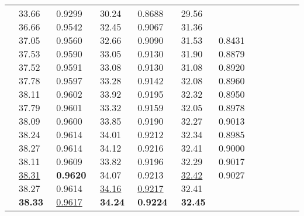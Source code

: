 \documentclass[runningheads]{llncs}
\begin{document}
\begin{table}[!ht]
\begin{tabular}{|p{7em}|p{2.5em}|p{2.5em}|p{3em}|p{2.5em}|p{3em}|p{2.5em}|p{3em}|p{2.5em}|p{3em}|p{2.5em}|p{3em}|}
		 \newline{} \newline{} \newline{} \newline{} \newline{} \newline{} \newline{} \newline{} \newline{} \newline{}  \newline{}  \newline{}  \newline{}  & 33.66 \newline{}36.66 \newline{}37.05 \newline{}37.53 \newline{}37.52 \newline{}37.78 \newline{}38.11 \newline{}37.79 \newline{}38.09 \newline{}38.24 \newline{}38.27 \newline{}38.11 \newline{}\underline{38.31} \newline{}38.27 \newline{}\bfseries{38.33} & 0.9299 \newline{}0.9542 \newline{}0.9560 \newline{}0.9590 \newline{}0.9591 \newline{}0.9597 \newline{}0.9602 \newline{}0.9601 \newline{}0.9600 \newline{}0.9614 \newline{}0.9614 \newline{}0.9609 \newline{}\textbf{0.9620} \newline{}0.9614 \newline{}\underline{0.9617}  & 30.24 \newline{}32.45 \newline{}32.66 \newline{}33.05 \newline{}33.08 \newline{}33.28 \newline{}33.92 \newline{}33.32 \newline{}33.85 \newline{}34.01 \newline{}34.12 \newline{}33.82 \newline{}34.07 \newline{}\underline{34.16} \newline{}\bfseries{34.24}  & 0.8688 \newline{}0.9067 \newline{}0.9090 \newline{}0.9130 \newline{}0.9130 \newline{}0.9142 \newline{}0.9195 \newline{}0.9159 \newline{}0.9190 \newline{}0.9212 \newline{}0.9216 \newline{}0.9196 \newline{}0.9213 \newline{}\underline{0.9217} \newline{}\bfseries{0.9224} & 29.56 \newline{}31.36 \newline{}31.53 \newline{}31.90 \newline{}31.08 \newline{}32.08 \newline{}32.32 \newline{}32.05 \newline{}32.27 \newline{}32.34 \newline{}32.41 \newline{}32.29 \newline{}\underline{32.42} \newline{}32.41 \newline{}\bfseries{32.45} & 0.8431 \newline{}0.8879 \newline{}0.8920 \newline{}0.8960 \newline{}0.8950 \newline{}0.8978 \newline{}0.9013 \newline{}0.8985 \newline{}0.9000 \newline{}0.9017 \newline{}0.9027
\end{tabular}
\end{table}
\end{document}
